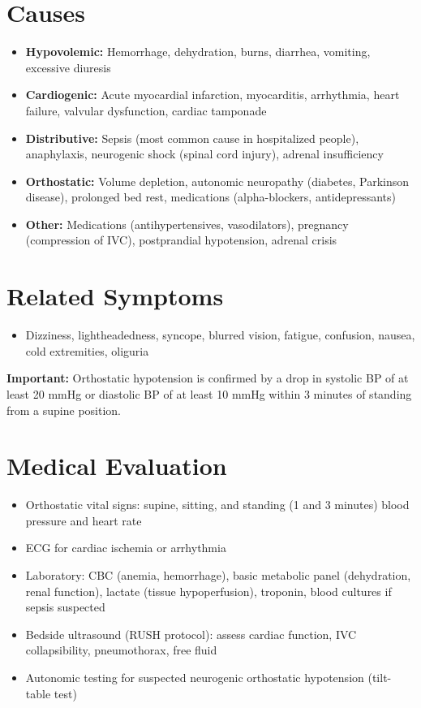 \section*{Causes}
\begin{itemize}
  \item \textbf{Hypovolemic:} Hemorrhage, dehydration, burns, diarrhea, vomiting, excessive diuresis
  \item \textbf{Cardiogenic:} Acute myocardial infarction, myocarditis, arrhythmia, heart failure, valvular dysfunction, cardiac tamponade
  \item \textbf{Distributive:} Sepsis (most common cause in hospitalized people), anaphylaxis, neurogenic shock (spinal cord injury), adrenal insufficiency
  \item \textbf{Orthostatic:} Volume depletion, autonomic neuropathy (diabetes, Parkinson disease), prolonged bed rest, medications (alpha-blockers, antidepressants)
  \item \textbf{Other:} Medications (antihypertensives, vasodilators), pregnancy (compression of IVC), postprandial hypotension, adrenal crisis
\end{itemize}

\section*{Related Symptoms}
\begin{itemize}
  \item Dizziness, lightheadedness, syncope, blurred vision, fatigue, confusion, nausea, cold extremities, oliguria
\end{itemize}
\textbf{Important:} Orthostatic hypotension is confirmed by a drop in systolic BP of at least 20 mmHg or diastolic BP of at least 10 mmHg within 3 minutes of standing from a supine position.

\section*{Medical Evaluation}
\begin{itemize}
  \item Orthostatic vital signs: supine, sitting, and standing (1 and 3 minutes) blood pressure and heart rate
  \item ECG for cardiac ischemia or arrhythmia
  \item Laboratory: CBC (anemia, hemorrhage), basic metabolic panel (dehydration, renal function), lactate (tissue hypoperfusion), troponin, blood cultures if sepsis suspected
  \item Bedside ultrasound (RUSH protocol): assess cardiac function, IVC collapsibility, pneumothorax, free fluid
  \item Autonomic testing for suspected neurogenic orthostatic hypotension (tilt-table test)
\end{itemize}

